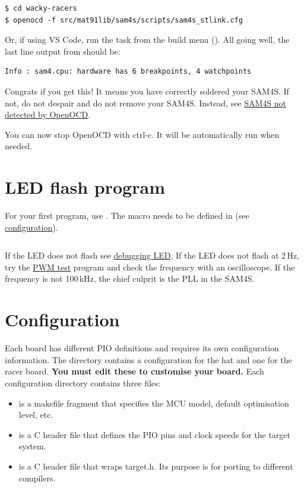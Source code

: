 \begin{verbatim}
$ cd wacky-racers
$ openocd -f src/mat91lib/sam4s/scripts/sam4s_stlink.cfg
\end{verbatim}

Or, if using VS Code, run the  task from the build
menu (). All going well, the last line output from
 should be:

\begin{verbatim}
Info : sam4.cpu: hardware has 6 breakpoints, 4 watchpoints
\end{verbatim}

Congrats if you get this! It means you have correctly soldered your
SAM4S. If not, do not despair and do not remove your SAM4S. Instead,
see \protect\hyperref[sam4s-not-detected-by-openocd]{SAM4S not
  detected by OpenOCD}.

You can now stop OpenOCD with ctrl-c.  It will be automatically run
when needed.


\section{LED flash program}
\label{led-flash-program}

For your first program, use
. The macro 
needs to be defined in  (see
\protect\hyperref[configuration]{configuration}).

\inputminted{C}{../../src/test-apps/ledflash1/ledflash1.c}

If the LED does not flash see \hyperref[debugging-LED]{debugging LED}.
If the LED does not flash at 2\,Hz, try the \hyperref[pwm-test]{PWM
  test} program and check the frequency with an oscilloscope.  If the
frequency is not 100\,kHz, the chief culprit is the PLL in the SAM4S.


\section{Configuration}
\label{configuration}

Each board has different PIO definitions and requires its own
configuration information. The  directory contains a
configuration for the hat and one for the racer board.  \textbf{You
must edit these to customise your board.}  Each configuration
directory contains three files:

\begin{itemize}
\item
   is a makefile fragment that specifies the MCU model,
  default optimisation level, etc.
\item
   is a C header file that defines the PIO pins and
  clock speeds for the target system.
\item
   is a C header file that wraps target.h.  Its purpose
  is for porting to different compilers.
\end{itemize}

